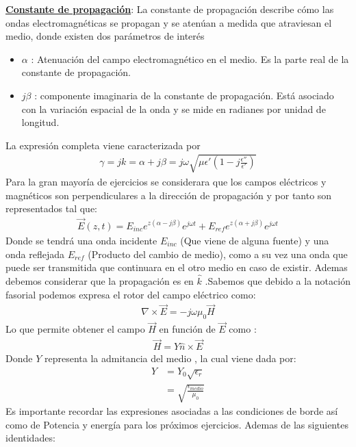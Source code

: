\documentclass[
  11pt,
  letterpaper,
   addpoints,
   answers
  ]{exam}
\begin{document}
\vspace{0.5cm}
\noindent
\vspace{.85cm}
\textbf{\underline{Constante de propagación}}: La constante de propagación describe cómo las ondas electromagnéticas se propagan y se atenúan a medida que atraviesan el medio, donde existen dos parámetros de interés 
\begin{itemize}
    \item $\alpha$ : Atenuación del campo electromagnético en el medio. Es la parte real de la constante de propagación.
    \item $j\beta$ :  componente imaginaria de la constante de propagación. Está asociado con la variación espacial de la onda y se mide en radianes por unidad de longitud.
\end{itemize}
La expresión completa viene caracterizada por
\begin{align}
    \gamma = jk = \alpha + j\beta = j\omega \sqrt{\mu \epsilon'\left( 1- j \frac{\epsilon''}{\epsilon'} \right)}
\end{align}
Para la gran mayoría de ejercicios se considerara que los campos eléctricos y magnéticos son perpendiculares a la dirección de propagación y por tanto son representados tal que:
\begin{align}
    \Vec{E}(z,t) = E_{inc}e^{z(\alpha - j\beta)}e^{j\omega t} + E_{ref}e^{z(\alpha +j\beta)}e^{j\omega t}
\end{align}
Donde se tendrá una onda incidente $E_{inc}$ (Que viene de alguna fuente)  y una onda reflejada  $E_{ref}$ (Producto del cambio de medio),  como a su vez una onda que puede ser transmitida que continuara en el otro medio en caso de existir. Ademas debemos considerar que la propagación es en $\hat{k}$ .Sabemos que debido a la notación fasorial podemos expresa el rotor del campo eléctrico como:
\begin{align}
    \nabla \times \Vec{E} = -j\omega\mu_{0}\Vec{H}
\end{align}
Lo que permite obtener el campo $\Vec{H}$ en función de $\Vec{E}$ como : 
\begin{align}
    \Vec{H} = Y\hat{n} \times \Vec{E}
\end{align}
Donde $Y$ representa la admitancia del medio , la cual viene dada por:
\begin{align}
    Y &= Y_{0}\sqrt{\epsilon_{r}}\\
      &= \sqrt{\frac{\epsilon_{medio}}{\mu_{0}}}
\end{align}
Es importante recordar las expresiones asociadas a las condiciones de borde así como de Potencia y energía para los próximos ejercicios. Ademas de las siguientes identidades:
\end{document}
